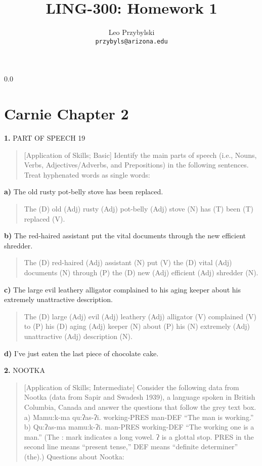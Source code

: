 \documentclass[11pt,notitlepage]{article}
\title{LING-300: Homework 1}
\author{Leo Przybylski\\
\texttt{przybyls@arizona.edu}}
\newcommand{\question}[2]{\textbf{#1.} #2}
\newcommand{\subquestion}[2]{\par\hspace{0.5cm} \textbf{#1)} #2}
\begin{document}
  \maketitle
  {\setlength{\baselineskip}%
           {0.0\baselineskip}
  \section*{Carnie Chapter 2}
  \hrulefill \par}

\question{1}{PART OF SPEECH 19}
\begin{quote}
[Application of Skills; Basic]
Identify the main parts of speech (i.e., Nouns, Verbs,
Adjectives/Adverbs, and Prepositions) in the following
sentences. Treat hyphenated words as single words:
\end{quote}

\subquestion{a}{The old rusty pot-belly stove has been replaced.}
\begin{quote}
  The (D) old (Adj) rusty (Adj) pot-belly (Adj) stove (N) has (T) been
  (T) replaced (V).
\end{quote}

\subquestion{b}{The red-haired assistant put the vital documents
  through the new efficient shredder.}

\begin{quote}
  The (D) red-haired (Adj) assistant (N) put (V) the (D) vital (Adj)
  documents (N) through (P) the (D) new (Adj) efficient (Adj) shredder (N).
\end{quote}

\subquestion{c}{The large evil leathery alligator complained to his aging keeper about his
extremely unattractive description.}

\begin{quote}
  The (D) large (Adj) evil (Adj) leathery (Adj) alligator (V)
  complained (V) to (P) his (D) aging (Adj) keeper (N) about (P) his
  (N) extremely (Adj) unattractive (Adj) description (N).
\end{quote}

\subquestion{d}{I’ve just eaten the last piece of chocolate cake.}

\question{2}{NOOTKA}
\begin{quote}
[Application of Skills; Intermediate]
Consider the following data from Nootka (data from Sapir and Swadesh 1939), a language spoken in British Columbia, Canada and answer the questions that follow the grey text box.
a) Mamu:k-ma qu:ʔas-ʔi. working-PRES man-DEF “The man is working.”
b) Qu:ʔas-ma mamu:k-ʔi. man-PRES working-DEF “The working one is a man.”
(The : mark indicates a long vowel. ʔ is a glottal stop. PRES in the second line means “present tense,” DEF means “definite determiner” (the).)
Questions about Nootka:
\end{quote}
\end{document}
